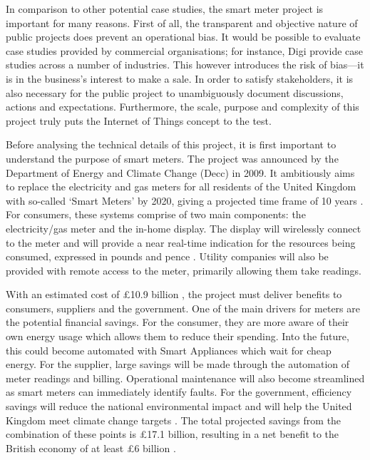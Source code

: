       In comparison to other potential case studies, the smart meter project is important for many reasons. First of all, the transparent and objective nature of public projects does prevent an operational bias. It would be possible to evaluate case studies provided by commercial organisations; for instance, Digi provide case studies across a number of industries. This however introduces the risk of bias---it is in the business's interest to make a sale. In order to satisfy stakeholders, it is also necessary for the public project to unambiguously document discussions, actions and expectations. Furthermore, the scale, purpose and complexity of this project truly puts the Internet of Things concept to the test.

      Before analysing the technical details of this project, it is first important to understand the purpose of smart meters. The project was announced by the Department of Energy and Climate Change (Decc) in 2009. It ambitiously aims to replace the electricity and gas meters for all residents of the United Kingdom with so-called `Smart Meters' by 2020, giving a projected time frame of 10 years \citep{SMannouncement:2009}. For consumers, these systems comprise of two main components: the electricity/gas meter and the in-home display. The display will wirelessly connect to the meter and will provide a near real-time indication for the resources being consumed, expressed in pounds and pence \citep{SMguide:2013}. Utility companies will also be provided with remote access to the meter, primarily allowing them take readings.

      With an estimated cost of £10.9 billion \citep{SMthirdreport:2014}, the project must deliver benefits to consumers, suppliers and the government. One of the main drivers for meters are the potential financial savings. For the consumer, they are more aware of their own energy usage which allows them to reduce their spending. Into the future, this could become automated with Smart Appliances which wait for cheap energy. For the supplier, large savings will be made through the automation of meter readings and billing. Operational maintenance will also become streamlined as smart meters can immediately identify faults. For the government, efficiency savings will reduce the national environmental impact and will help the United Kingdom meet climate change targets \citep{SMUK:2012}. The total projected savings from the combination of these points is £17.1 billion, resulting in a net benefit to the British economy of at least £6 billion \citep{SMthirdreport:2014}.

